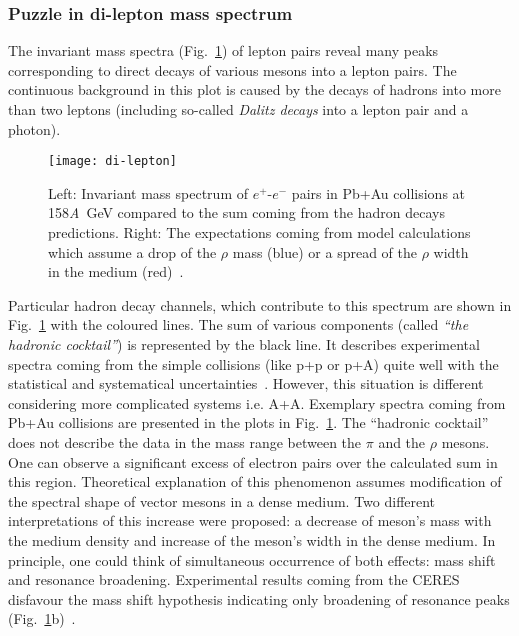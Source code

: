       \subsubsection{Puzzle in di-lepton mass spectrum}
        The invariant mass spectra (Fig.~\ref{fig:di-lepton}) of lepton pairs reveal many peaks corresponding to direct decays of various mesons into a lepton pairs.
        The continuous background in this plot is caused by the decays of hadrons into more than two leptons (including so-called \textit{Dalitz decays} into a lepton pair and a photon).
        \begin{figure}[b]
          \centering
          \texttt{[image: di-lepton]}
          \caption{Left: Invariant mass spectrum of $e^{+}$-$e^{-}$ pairs in Pb+Au collisions at 158\textit{A}~GeV compared to the sum coming from the hadron decays predictions. Right: The expectations coming from model calculations which assume a drop of the $\rho$ mass (blue) or a spread of the $\rho$ width in the medium (red)~\cite{marin}.}
          \label{fig:di-lepton}
        \end{figure}
        Particular hadron decay channels, which contribute to this spectrum are shown in Fig.~\ref{fig:di-lepton} with the coloured lines.
        The sum of various components (called \textit{``the hadronic cocktail''}) is represented by the black line.
        It describes experimental spectra coming from the simple collisions (like p+p or p+A) quite well with the statistical and systematical uncertainties~\cite{bartke}.
        However, this situation is different considering more complicated systems i.e. A+A.
        Exemplary spectra coming from Pb+Au collisions are presented in the plots in Fig.~\ref{fig:di-lepton}.
        The ``hadronic cocktail'' does not describe the data in the mass range between the $\pi$ and the $\rho$ mesons.
        One can observe a significant excess of electron pairs over the calculated sum in this region.
        Theoretical explanation of this phenomenon assumes modification of the spectral shape of vector mesons in a dense medium.
        Two different interpretations of this increase were proposed: a decrease of meson's mass with the medium density and increase of the meson's width in the dense medium.
        In principle, one could think of simultaneous occurrence of both effects: mass shift and resonance broadening.
        Experimental results coming from the CERES disfavour the mass shift hypothesis indicating only broadening of resonance peaks (Fig.~\ref{fig:di-lepton}b)~\cite{bartke}.

